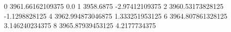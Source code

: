 0 3961.66162109375 0.0
1 3958.6875 -2.97412109375
2 3960.53173828125 -1.1298828125
4 3962.994873046875 1.333251953125
6 3964.807861328125 3.146240234375
8 3965.87939453125 4.2177734375
